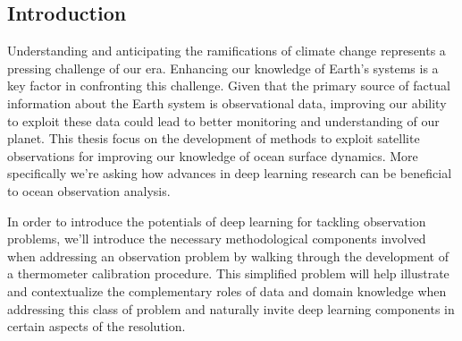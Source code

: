 \begin{bibunit}

\chapter*{Introduction}

Understanding and anticipating the ramifications of climate change represents a pressing challenge of our era.
Enhancing our knowledge of Earth's systems is a key factor in confronting this challenge.
  Given that the primary source of factual information about the Earth system is observational data, improving our ability to exploit these data could lead to better monitoring and understanding of our planet.
  This thesis focus on the development of methods to exploit satellite observations for improving our knowledge of ocean surface dynamics. 
  More specifically we're asking how advances in deep learning research can be beneficial to ocean observation analysis.
  
  In order to introduce the potentials of deep learning for tackling observation problems, we'll introduce the necessary methodological components involved when addressing an observation problem by walking through the development of a thermometer calibration procedure. This simplified problem will help illustrate and contextualize the complementary roles of data and domain knowledge when addressing this class of problem and naturally invite deep learning components in certain aspects of the resolution. 
  

\end{bibunit}
